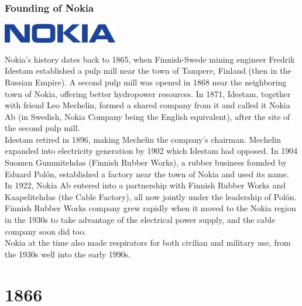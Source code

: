 \documentclass[11pt]{report}
\begin{document}
\subsection{Founding of Nokia}
\vspace{2mm}\begin{center}\includegraphics[width=5cm]{./img/nokiaLogo.jpg}\end{center}
Nokia's history dates back to 1865, when Finnish-Swede mining engineer Fredrik Idestam established a pulp mill near the town of Tampere, Finland (then in the Russian Empire). A second pulp mill was opened in 1868 near the neighboring town of Nokia, offering better hydropower resources. In 1871, Idestam, together with friend Leo Mechelin, formed a shared company from it and called it Nokia Ab (in Swedish, Nokia Company being the English equivalent), after the site of the second pulp mill.\\
\indent Idestam retired in 1896, making Mechelin the company's chairman. Mechelin expanded into electricity generation by 1902 which Idestam had opposed. In 1904 Suomen Gummitehdas (Finnish Rubber Works), a rubber business founded by Eduard Polón, established a factory near the town of Nokia and used its name.\\ \indent In 1922, Nokia Ab entered into a partnership with Finnish Rubber Works and Kaapelitehdas (the Cable Factory), all now jointly under the leadership of Polón. Finnish Rubber Works company grew rapidly when it moved to the Nokia region in the 1930s to take advantage of the electrical power supply, and the cable company soon did too.\\
\indent Nokia at the time also made respirators for both civilian and military use, from the 1930s well into the early 1990s.

\chapter{1866}
\section{}
\end{document}
